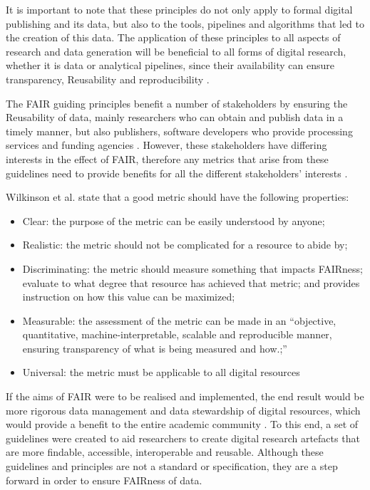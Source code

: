 \documentclass{cisfyp}
\begin{document}
It is important to note that these principles do not only apply to formal digital publishing and its data, but also to the tools, pipelines and algorithms that led to the creation of this data. The application of these principles to all aspects of research and data generation will be beneficial to all forms of digital research, whether it is data or analytical pipelines, since their availability can ensure transparency, Reusability and reproducibility \cite{Wilkinson2016}.

The FAIR guiding principles benefit a number of stakeholders by ensuring the Reusability of data, mainly researchers who can obtain and publish data in a timely manner, but also publishers, software developers who provide processing services and funding agencies \cite{Wilkinson2016}. However, these stakeholders have differing interests in the effect of FAIR, therefore any metrics that arise from these guidelines need to provide benefits for all the different stakeholders' interests \cite{Wilkinson2018}.

Wilkinson et al. state that a good metric should have the following properties: \cite{Wilkinson2018}
\begin{itemize}
	\item Clear: the purpose of the metric can be easily understood by anyone;
	\item Realistic: the metric should not be complicated for a resource to abide by;
	\item Discriminating: the metric should measure something that impacts FAIRness; evaluate to what degree that resource has achieved that metric; and provides instruction on how this value can be maximized;
	\item Measurable: the assessment of the metric can be made in an ``objective, quantitative, machine-interpretable, scalable and reproducible manner, ensuring transparency of what is being measured and how.;''
	\item Universal: the metric must be applicable to all digital resources
\end{itemize}

If the aims of FAIR were to be realised and implemented, the end result would be more rigorous data management and data stewardship of digital resources, which would provide a benefit to the entire academic community \cite{Wilkinson2016}. To this end, a
set of guidelines were created to aid researchers to create digital research artefacts that are more findable, accessible, interoperable and reusable. Although these guidelines and principles are not a standard or specification, they are a step forward in order to ensure FAIRness of data.
\end{document}
